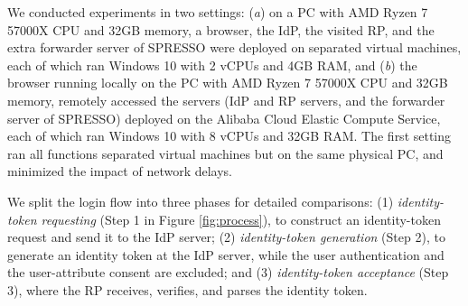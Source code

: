 We conducted experiments in two settings: (\emph{a}) on a PC with AMD Ryzen 7 57000X CPU and 32GB memory, a browser, the IdP, the visited RP, and the extra forwarder server of SPRESSO were deployed on separated virtual machines, each of which ran Windows 10 with 2 vCPUs and 4GB RAM, and (\emph{b}) the browser running locally on the PC with AMD Ryzen 7 57000X CPU and 32GB memory, remotely accessed the servers (IdP and RP servers, and the forwarder server of SPRESSO) deployed on the Alibaba Cloud Elastic Compute Service, each of which ran Windows 10 with 8 vCPUs and 32GB RAM. 
The first setting ran all functions separated virtual machines but on the same physical PC,
    and minimized the impact of network delays.




 We split the login flow into three phases for detailed comparisons: (1)
{\em identity-token requesting} (Step 1 in Figure \ref{fig:process}), to construct an identity-token request and send it to the IdP server; (2) {\em identity-token generation} (Step 2), to generate an identity token at the IdP server, while the user authentication and the user-attribute consent are excluded; and (3) {\em identity-token acceptance} (Step 3), where the RP receives, verifies, and parses the identity token.



